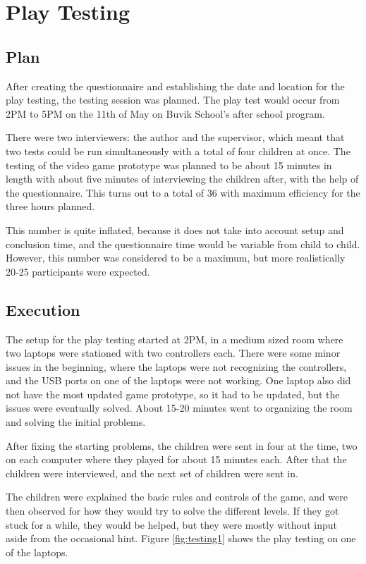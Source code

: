 \chapter{Play Testing}
\label{chp:play_test}
\section{Plan}
After creating the questionnaire and establishing the date and location for the play testing, the testing session was planned. The play test would occur from 2PM to 5PM on the 11th of May on Buvik School's after school program. 

There were two interviewers: the author and the supervisor, which meant that two tests could be run simultaneously with a total of four children at once. The testing of the video game prototype was planned to be about 15 minutes in length with about five minutes of interviewing the children after, with the help of the questionnaire. This turns out to a total of 36 with maximum efficiency for the three hours planned. 

This number is quite inflated, because it does not take into account setup and conclusion time, and the questionnaire time would be variable from child to child. However, this number was considered to be a maximum, but more realistically 20-25 participants were expected.


\section{Execution}
The setup for the play testing started at 2PM, in a medium sized room where two laptops were stationed with two controllers each. There were some minor issues in the beginning, where the laptops were not recognizing the controllers, and the USB ports on one of the laptops were not working. One laptop also did not have the most updated game prototype, so it had to be updated, but the issues were eventually solved. About 15-20 minutes went to organizing the room and solving the initial problems.

After fixing the starting problems, the children were sent in four at the time, two on each computer where they played for about 15 minutes each. After that the children were interviewed, and the next set of children were sent in.

The children were explained the basic rules and controls of the game, and were then observed for how they would try to solve the different levels. If they got stuck for a while, they would be helped, but they were mostly without input aside from the occasional hint. Figure \ref{fig:testing1} shows the play testing on one of the laptops.

